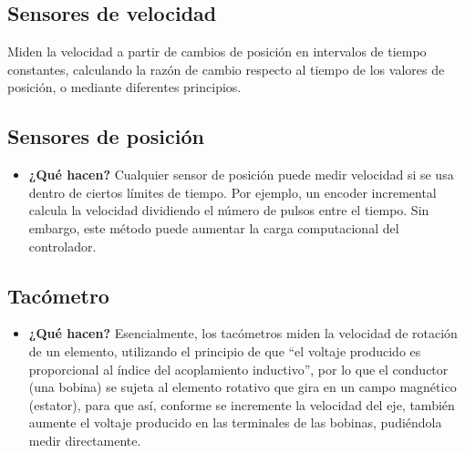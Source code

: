 	\begin{figure}[h]
	\centering
\end{figure}



\subsection{Sensores de velocidad} Miden la velocidad a partir de cambios de posición en intervalos de tiempo constantes, calculando la razón de cambio respecto al tiempo de los valores de posición, o mediante diferentes principios.

\subsection*{Sensores de posición}
\begin{itemize}
	\item \textbf{¿Qué hacen?} Cualquier sensor de posición puede medir velocidad si se usa dentro de ciertos límites de tiempo. Por ejemplo, un encoder incremental calcula la velocidad dividiendo el número de pulsos entre el tiempo. Sin embargo, este método puede aumentar la carga computacional del controlador.
	
\end{itemize}

\subsection*{Tacómetro}
\begin{itemize}
	\item \textbf{¿Qué hacen?} Esencialmente, los tacómetros miden la velocidad de rotación de un elemento, utilizando el principio de que “el voltaje producido es proporcional al índice del acoplamiento inductivo”, por lo que el conductor (una bobina) se sujeta al elemento rotativo que gira en un campo magnético (estator), para que así, conforme se incremente la velocidad del eje, también aumente el voltaje producido en las terminales de las bobinas, pudiéndola medir directamente. 	\cite{BFMX_SensoresInternosRobot} 		
\end{itemize}

	\begin{figure}[h]
	\centering
\end{figure}

